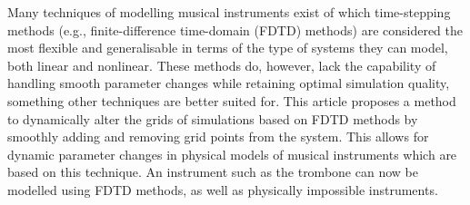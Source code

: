 Many techniques of modelling musical instruments exist of which time-stepping methods (e.g., finite-difference time-domain (FDTD) methods) are considered the most flexible and generalisable in terms of the type of systems they can model, both linear and nonlinear. These methods do, however, lack the capability of handling smooth parameter changes while retaining optimal simulation quality, something other techniques are better suited for. This article proposes a method to dynamically alter the grids of simulations based on FDTD methods by smoothly adding and removing grid points from the system. This allows for dynamic parameter changes in physical models of musical instruments which are based on this technique. An instrument such as the trombone can now be modelled using FDTD methods, as well as physically impossible instruments. %